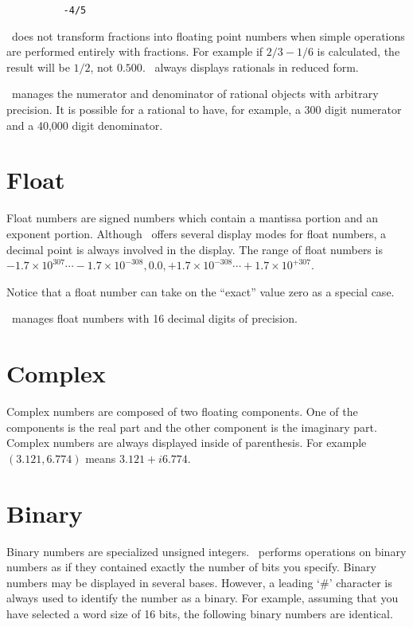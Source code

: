 \documentclass{report}
\begin{document}
\begin{verbatim}
          -4/5
\end{verbatim}

\CLAC\ does not transform fractions into floating point numbers when simple operations are
performed entirely with fractions. For example if $2/3 - 1/6$ is calculated, the result will be
$1/2$, not $0.500$. \CLAC\ always displays rationals in reduced form.

\CLAC\ manages the numerator and denominator of rational objects with arbitrary precision. It is
possible for a rational to have, for example, a 300 digit numerator and a 40,000 digit
denominator.

\section{Float}

Float numbers are signed numbers which contain a mantissa portion and an exponent portion.
Although \CLAC\ offers several display modes for float numbers, a decimal point is always
involved in the display. The range of float numbers is $-1.7\times 10^{307} \cdots -1.7\times
10^{-308}, 0.0, +1.7\times 10^{-308} \cdots +1.7\times 10^{+307}$.

Notice that a float number can take on the ``exact'' value zero as a special case.

\CLAC\ manages float numbers with 16 decimal digits of precision.

\section{Complex}

Complex numbers are composed of two floating components. One of the components is the real part
and the other component is the imaginary part. Complex numbers are always displayed inside of
parenthesis. For example $(3.121, 6.774)$ means $3.121 + i 6.774$.

\section{Binary}

Binary numbers are specialized unsigned integers. \CLAC\ performs operations on binary numbers
as if they contained exactly the number of bits you specify. Binary numbers may be displayed in
several bases. However, a leading `\#' character is always used to identify the number as a
binary. For example, assuming that you have selected a word size of 16 bits, the following
binary numbers are identical.
\end{document}
